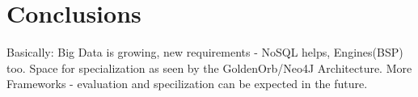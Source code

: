 \documentclass{acm_proc_article-sp}
\begin{document}
\section{Conclusions}

Basically: Big Data is growing, new requirements - NoSQL helps, Engines(BSP) too.
Space for specialization as seen by the GoldenOrb/Neo4J Architecture.
More Frameworks - evaluation and specilization can be expected in the future.


%

%
%
\end{document}
